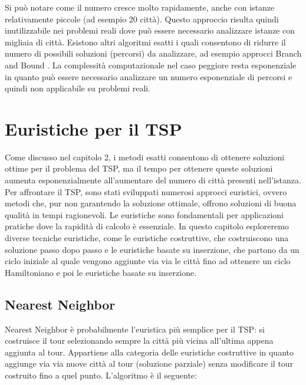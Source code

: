 \documentclass[a4paper,12pt]{report}
\begin{document}
Si può notare come il numero cresce molto rapidamente, anche con istanze relativamente piccole (ad esempio 20 città). Questo approccio risulta quindi inutilizzabile nei problemi reali dove può essere necessario analizzare istanze con migliaia di città.
\newline \null \newline Esistono altri algoritmi esatti i quali consentono di ridurre il numero di possibili soluzioni (percorsi) da analizzare, ad esempio approcci Branch and Bound \cite{Branch and Bound}. La complessità computazionale nel caso peggiore resta esponenziale in quanto può essere necessario analizzare un numero esponenziale di percorsi e quindi non applicabile su problemi reali.

\chapter{Euristiche per il TSP}
Come discusso nel capitolo 2, i metodi esatti consentono di ottenere soluzioni ottime per il problema del TSP, ma il tempo per ottenere queste soluzioni aumenta esponenzialmente all'aumentare del numero di città presenti nell'istanza. Per affrontare il TSP, sono stati sviluppati numerosi approcci euristici, ovvero metodi che, pur non garantendo la soluzione ottimale, offrono soluzioni di buona qualità in tempi ragionevoli. Le euristiche sono fondamentali per applicazioni pratiche dove la rapidità di calcolo è essenziale. In questo capitolo esploreremo diverse tecniche euristiche, come le euristiche costruttive, che costruiscono una soluzione passo dopo passo e le euristiche basate su inserzione, che partono da un ciclo iniziale al quale vengono aggiunte via via le città fino ad ottenere un ciclo Hamiltoniano e poi le euristiche basate su inserzione.
\section{Nearest Neighbor}
Nearest Neighbor è probabilmente l'euristica più semplice per il TSP: si costruisce il tour selezionando sempre la città più vicina all'ultima appena aggiunta al tour. Appartiene alla categoria delle euristiche costruttive in quanto aggiunge via via nuove città al tour (soluzione parziale) senza modificare il tour costruito fino a quel punto. L'algoritmo è il seguente:
\end{document}
